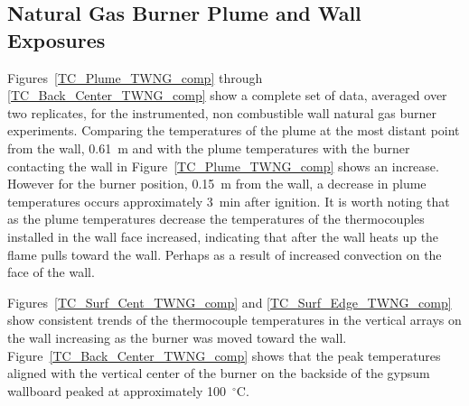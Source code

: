 \documentclass[twoside]{uocthesis}
\begin{document}
{\subsection{Natural Gas Burner Plume and Wall Exposures}
Figures~\ref{TC_Plume_TWNG_comp} through \ref{TC_Back_Center_TWNG_comp} show a complete set of data, averaged over two replicates, for the instrumented, non combustible wall natural gas burner experiments.  Comparing the temperatures of the plume at the most distant point from the wall, 0.61~m and with the plume temperatures with the burner contacting the wall in Figure~\ref{TC_Plume_TWNG_comp} shows an increase.  However for the burner position, 0.15~m from the wall, a decrease in plume temperatures occurs approximately 3~min after ignition.  It is worth noting that as the plume temperatures decrease the temperatures of the thermocouples installed in the wall face increased, indicating that after the wall heats up the flame pulls toward the wall.  Perhaps as a result of increased convection on the face of the wall. 

Figures~\ref{TC_Surf_Cent_TWNG_comp} and \ref{TC_Surf_Edge_TWNG_comp} show consistent trends of the thermocouple temperatures in the vertical arrays on the wall increasing as the burner was moved toward the wall.  Figure~\ref{TC_Back_Center_TWNG_comp} shows that the peak temperatures aligned with the vertical center of the burner on the backside of the gypsum wallboard peaked at approximately 100~$^\circ$C.


}
\end{document}
